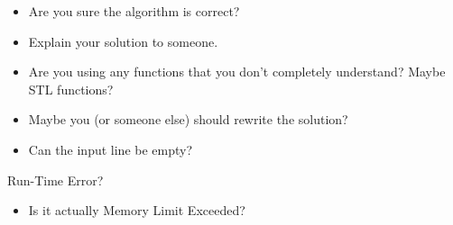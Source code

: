 \begin{myitemize}
\begin{itemize}
          \item Are you sure the algorithm is correct?
          \item Explain your solution to someone.
          \item Are you using any functions that you don't completely understand? Maybe STL functions?
          \item Maybe you (or someone else) should rewrite the solution?
          \item Can the input line be empty?
        \end{itemize}
      \item Run-Time Error?
        \begin{itemize}
          \item Is it actually Memory Limit Exceeded?
        \end{itemize}
    \end{myitemize}

